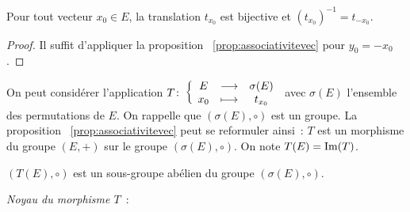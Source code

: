 \begin{prop}
  Pour tout vecteur \(x_0 \in E\), la translation \(t_{x_0}\) est bijective et \((t_{x_0})^{-1}=t_{-x_0}\).
\end{prop}
\begin{proof}
  Il suffit d'appliquer la proposition~
\ref{prop:associativitevec} pour \(y_0=-x_0\).
\end{proof}

On peut considérer l'application \(T\colon \left\{\begin{array}{ccc} E & \longrightarrow &\sigma(E)\\ x_0 & \longmapsto & t_{x_0} \end{array} \right.\) avec \(\sigma(E)\) l'ensemble des permutations de \(E\). On rappelle que \((\sigma(E),\circ)\) est un groupe. La proposition~
\ref{prop:associativitevec} peut se reformuler ainsi~: \(T\) est un morphisme du groupe \((E,+)\) sur le groupe \((\sigma(E),\circ)\). On note \(T(E)=\operatorname{Im}(T)\).

\begin{prop}
  \((T(E),\circ)\) est un sous-groupe abélien du groupe \((\sigma(E),\circ)\).
\end{prop}

\emph{Noyau du morphisme \(T\)}~:

